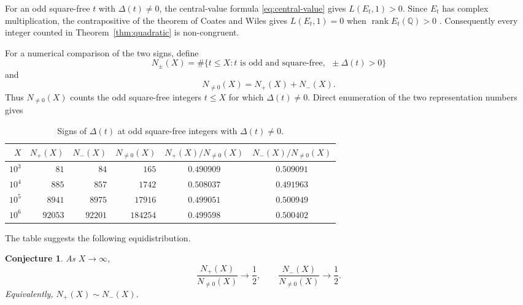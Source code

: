 \documentclass[10pt,a4paper]{amsart}
\newtheorem{conjecture}[theorem]{Conjecture}
\newcommand{\Q}{\mathbb Q}
\begin{document}
For an odd square-free $t$ with $\Delta(t)\ne0$, the central-value formula
\eqref{eq:central-value} gives $L(E_t,1)>0$. Since $E_t$ has complex
multiplication, the contrapositive of the theorem of Coates and Wiles
gives $L(E_t,1)=0$ when $\operatorname{rank}E_t(\Q)>0$
\cite{CoatesWiles}. Consequently every
integer counted in Theorem~\ref{thm:quadratic} is non-congruent.

For a numerical comparison of the two signs, define
\[
N_\pm(X)=\#\{t\leq X:t\text{ is odd and square-free},\
             \ \pm\Delta(t)>0\}
\]
and
\[
N_{\ne0}(X)=N_+(X)+N_-(X).
\]
Thus $N_{\ne0}(X)$ counts the odd square-free integers $t\le X$ for which
$\Delta(t)\ne0$. Direct enumeration of the two representation numbers gives
\begin{table}[ht]
\centering
\small
\setlength{\tabcolsep}{4pt}
\begin{tabular}{rrrrcc}
\toprule
$X$ & $N_+(X)$ & $N_-(X)$ & $N_{\ne0}(X)$
& $N_+(X)/N_{\ne0}(X)$ & $N_-(X)/N_{\ne0}(X)$ \\
\midrule
$10^3$ & $81$ & $84$ & $165$ & $0.490909$ & $0.509091$ \\
$10^4$ & $885$ & $857$ & $1742$ & $0.508037$ & $0.491963$ \\
$10^5$ & $8941$ & $8975$ & $17916$ & $0.499051$ & $0.500949$ \\
$10^6$ & $92053$ & $92201$ & $184254$ & $0.499598$ & $0.500402$ \\
\bottomrule
\end{tabular}
\caption{Signs of $\Delta(t)$ at odd square-free integers with
$\Delta(t)\ne0$.}
\label{tab:numerical-signs}
\end{table}

The table suggests the following equidistribution.

\begin{conjecture}\label{conj:sign-equidistribution}
As $X\to\infty$,
\[
\frac{N_+(X)}{N_{\ne0}(X)}\longrightarrow\frac12,
\qquad
\frac{N_-(X)}{N_{\ne0}(X)}\longrightarrow\frac12.
\]
Equivalently, $N_+(X)\sim N_-(X)$.
\end{conjecture}
\end{document}
